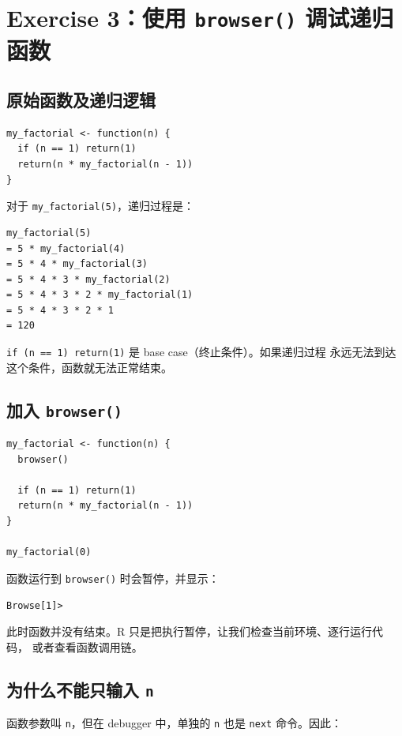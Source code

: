 \documentclass[11pt,a4paper]{ctexart}
\begin{document}
\section{Exercise 3：使用 \texttt{browser()} 调试递归函数}

\subsection{原始函数及递归逻辑}

\begin{lstlisting}[style=rcode]
my_factorial <- function(n) {
  if (n == 1) return(1)
  return(n * my_factorial(n - 1))
}
\end{lstlisting}

对于 \lstinline|my_factorial(5)|，递归过程是：

\begin{lstlisting}[style=textcode]
my_factorial(5)
= 5 * my_factorial(4)
= 5 * 4 * my_factorial(3)
= 5 * 4 * 3 * my_factorial(2)
= 5 * 4 * 3 * 2 * my_factorial(1)
= 5 * 4 * 3 * 2 * 1
= 120
\end{lstlisting}

\lstinline|if (n == 1) return(1)| 是 base case（终止条件）。如果递归过程
永远无法到达这个条件，函数就无法正常结束。

\subsection{加入 \texttt{browser()}}

\begin{lstlisting}[style=rcode]
my_factorial <- function(n) {
  browser()

  if (n == 1) return(1)
  return(n * my_factorial(n - 1))
}

my_factorial(0)
\end{lstlisting}

函数运行到 \lstinline|browser()| 时会暂停，并显示：

\begin{lstlisting}[style=textcode]
Browse[1]>
\end{lstlisting}

此时函数并没有结束。R 只是把执行暂停，让我们检查当前环境、逐行运行代码，
或者查看函数调用链。

\subsection{为什么不能只输入 \texttt{n}}

函数参数叫 \lstinline|n|，但在 debugger 中，单独的 \lstinline|n| 也是
\texttt{next} 命令。因此：
\end{document}
